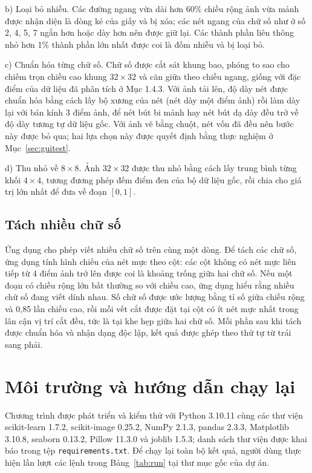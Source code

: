 \documentclass[a4paper,oneside]{report}
\begin{document}
b) Loại bỏ nhiễu. Các đường ngang vừa dài hơn 60\% chiều rộng ảnh vừa mảnh được nhận diện là dòng kẻ của giấy và bị
xóa; các nét ngang của chữ số như ở số 2, 4, 5, 7 ngắn hơn hoặc dày hơn nên được giữ lại. Các thành phần liên thông
nhỏ hơn 1\% thành phần lớn nhất được coi là đốm nhiễu và bị loại bỏ.

c) Chuẩn hóa từng chữ số. Chữ số được cắt sát khung bao, phóng to sao cho chiếm trọn chiều cao khung
$32 \times 32$ và căn giữa theo chiều ngang, giống với đặc điểm của dữ liệu đã phân tích ở Mục 1.4.3. Với ảnh tải
lên, độ dày nét được chuẩn hóa bằng cách lấy bộ xương của nét (nét dày một điểm ảnh) rồi làm dày lại với bán kính
3 điểm ảnh, để nét bút bi mảnh hay nét bút dạ dày đều trở về độ dày tương tự dữ liệu gốc. Với ảnh vẽ bằng chuột,
nét vốn đã đều nên bước này được bỏ qua; hai lựa chọn này được quyết định bằng thực nghiệm ở Mục~\ref{sec:guitest}.

d) Thu nhỏ về $8 \times 8$. Ảnh $32 \times 32$ được thu nhỏ bằng cách lấy trung bình từng khối $4 \times 4$, tương
đương phép đếm điểm đen của bộ dữ liệu gốc, rồi chia cho giá trị lớn nhất để đưa về đoạn $[0, 1]$.

\subsection{Tách nhiều chữ số}

Ứng dụng cho phép viết nhiều chữ số trên cùng một dòng. Để tách các chữ số, ứng dụng tính hình chiếu của nét mực
theo cột: các cột không có nét mực liên tiếp từ 4 điểm ảnh trở lên được coi là khoảng trống giữa hai chữ số. Nếu
một đoạn có chiều rộng lớn bất thường so với chiều cao, ứng dụng hiểu rằng nhiều chữ số đang viết dính nhau. Số chữ
số được ước lượng bằng tỉ số giữa chiều rộng và 0,85 lần chiều cao, rồi mỗi vết cắt được đặt tại cột có ít nét mực
nhất trong lân cận vị trí cắt đều, tức là tại khe hẹp giữa hai chữ số. Mỗi phần sau khi tách được chuẩn hóa và nhận
dạng độc lập, kết quả được ghép theo thứ tự từ trái sang phải.

\section{Môi trường và hướng dẫn chạy lại}

{\sloppy Chương trình được phát triển và kiểm thử với Python 3.10.11 cùng các thư viện scikit-learn 1.7.2,
scikit-image 0.25.2, NumPy 2.1.3, pandas 2.3.3, Matplotlib 3.10.8, seaborn 0.13.2, Pillow 11.3.0 và joblib 1.5.3;
danh sách thư viện được khai báo trong tệp \texttt{requirements.txt}. Để chạy lại toàn bộ kết quả, người dùng thực
hiện lần lượt các lệnh trong Bảng~\ref{tab:run} tại thư mục gốc của dự án.\par}
\end{document}
